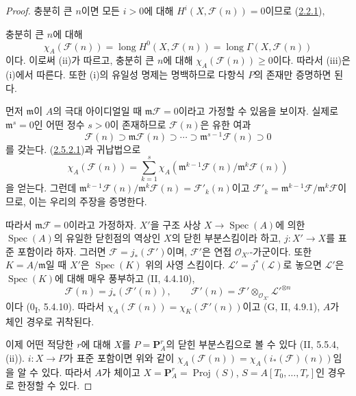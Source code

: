 \begin{proof}
충분히 큰 $n$이면 모든 $i>0$에 대해
$H^i(X,\mathcal F(n))=0$이므로
(\hyperref[III.2.2.1-fr]{2.2.1}),

충분히 큰 $n$에 대해
\[
\chi_A(\mathcal F(n))=\operatorname{long}H^0(X,\mathcal F(n))
=\operatorname{long}\Gamma(X,\mathcal F(n))
\]
이다. 이로써 (ii)가 따르고, 충분히 큰 $n$에 대해
$\chi_A(\mathcal F(n))\geq0$이다. 따라서 (iii)은 (i)에서 따른다.
또한 (i)의 유일성 명제는 명백하므로 다항식 $P$의 존재만 증명하면
된다.

먼저 $\mathfrak m$이 $A$의 극대 아이디얼일 때
$\mathfrak m\mathcal F=0$이라고 가정할 수 있음을 보이자. 실제로
$\mathfrak m^s=0$인 어떤 정수 $s>0$이 존재하므로 $\mathcal F(n)$은
유한 여과
\[
\mathcal F(n)\supset\mathfrak m\mathcal F(n)\supset\cdots
\supset\mathfrak m^{s-1}\mathcal F(n)\supset0
\]
를 갖는다. (\hyperref[III.2.5.2.1-fr]{2.5.2.1})과 귀납법으로
\[
\chi_A(\mathcal F(n))=\sum_{k=1}^{s}
\chi_A(\mathfrak m^{k-1}\mathcal F(n)/\mathfrak m^k\mathcal F(n))
\]
을 얻는다. 그런데
$\mathfrak m^{k-1}\mathcal F(n)/\mathfrak m^k\mathcal F(n)
=\mathcal F'_k(n)$이고
$\mathcal F'_k=\mathfrak m^{k-1}\mathcal F/\mathfrak m^k\mathcal F$이므로,
이는 우리의 주장을 증명한다.

따라서 $\mathfrak m\mathcal F=0$이라고 가정하자. $X'$을 구조 사상
$X\to\operatorname{Spec}(A)$에 의한 $\operatorname{Spec}(A)$의 유일한
닫힌점의 역상인 $X$의 닫힌 부분스킴이라 하고, $j:X'\to X$를 표준
포함이라 하자. 그러면 $\mathcal F=j_*(\mathcal F')$이며,
$\mathcal F'$은 연접 $\mathcal O_{X'}$-가군이다. 또한
$K=A/\mathfrak m$일 때 $X'$은 $\operatorname{Spec}(K)$ 위의 사영
스킴이다. $\mathcal L'=j^*(\mathcal L)$로 놓으면 $\mathcal L'$은
$\operatorname{Spec}(K)$에 대해 매우 풍부하고 (II, 4.4.10),
\[
\mathcal F(n)=j_*(\mathcal F'(n)),\qquad
\mathcal F'(n)=\mathcal F'\otimes_{\mathcal O_{X'}}
\mathcal L'^{\otimes n}
\]
이다 (0\textsubscript{I}, 5.4.10). 따라서
$\chi_A(\mathcal F(n))=\chi_K(\mathcal F'(n))$이고
(G, II, 4.9.1), $A$가 체인 경우로 귀착된다.

이제 어떤 적당한 $r$에 대해 $X$를 $P=\mathbf P_A^r$의 닫힌
부분스킴으로 볼 수 있다 (II, 5.5.4, (ii)). $i:X\to P$가 표준
포함이면 위와 같이
$\chi_A(\mathcal F(n))=\chi_A(i_*(\mathcal F)(n))$임을 알 수 있다.
따라서 $A$가 체이고
$X=\mathbf P_A^r=\operatorname{Proj}(S)$,
$S=A[T_0,\ldots,T_r]$인 경우로 한정할 수 있다.


\end{proof}
